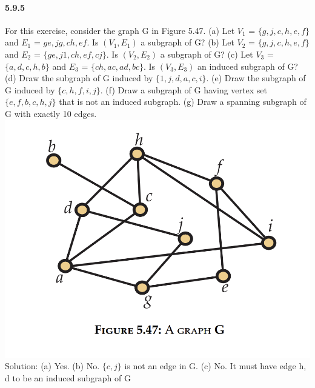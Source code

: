 \documentclass{article}
\begin{document}
\paragraph{5.9.5}
For this exercise, consider the graph G in Figure 5.47.\newline
(a) Let $V_1$ = $\{g, j, c, h, e, f \}$ and $E_1$ = ${ge, jg, ch, ef }$. Is $(V_1, E_1)$ a subgraph of G?
(b) Let $V_2$ = $\{g, j, c, h, e, f \}$ and $E_2$ = $\{ge, j1, ch, ef , cj\}$. Is $(V_2, E_2)$ a subgraph of G?
(c) Let $V_3$ = $\{a, d, c, h, b\}$ and $E_3$ = $\{ch, ac, ad, bc\}$. Is $(V_3, E_3)$ an induced subgraph of G?\newline
(d) Draw the subgraph of G induced by $\{1, j, d, a, c, i\}$.\newline
(e) Draw the subgraph of G induced by $\{c, h, f , i, j\}$.\newline
(f) Draw a subgraph of G having vertex set $\{e, f , b, c, h, j\}$ that is not an induced subgraph.\newline
(g) Draw a spanning subgraph of G with exactly 10 edges.\newline
\includegraphics{0038}
Solution:\newline
(a) Yes.\newline
(b) No. $\{c, j\}$ is not an edge in G.\newline
(c) No. It must have edge {h, d} to be an induced subgraph of G\newline
\end{document}

